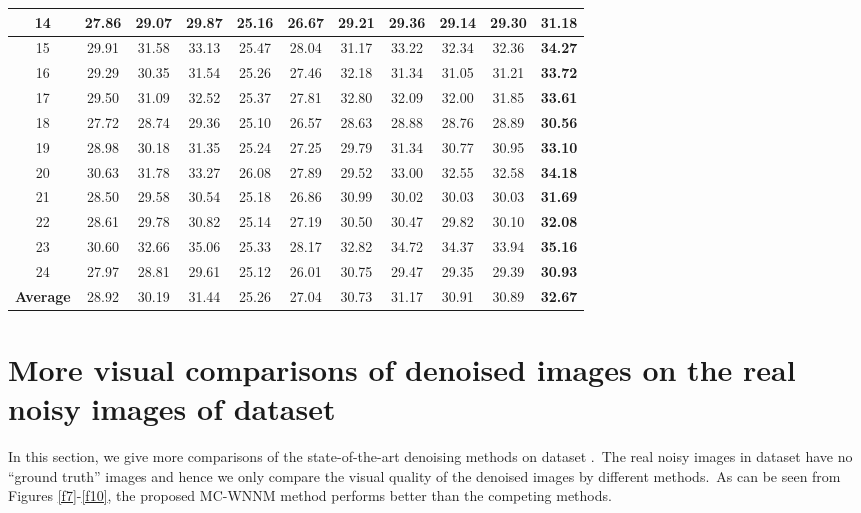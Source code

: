 \documentclass[10pt,onecolumn,letterpaper]{article}
\begin{document}
\begin{table}[!htbp]
\begin{center}
\begin{tabular}{|c||c|c|c|c|c|c|c|c|c|c|}
\\
\hline
14& 27.86 & 29.07 & 29.87 & 25.16 & 26.67 & 29.21 & 29.36 & 29.14 & 29.30 & \textbf{31.18}
\\
\hline
15& 29.91 & 31.58 & 33.13 & 25.47 & 28.04 & 31.17 & 33.22 & 32.34 & 32.36 & \textbf{34.27}
\\
\hline
16& 29.29 & 30.35 & 31.54 & 25.26 & 27.46 & 32.18 & 31.34 & 31.05 & 31.21 & \textbf{33.72}
\\
\hline
17& 29.50 & 31.09 & 32.52 & 25.37 & 27.81 & 32.80 & 32.09 & 32.00 & 31.85 & \textbf{33.61}
\\
\hline
18& 27.72 & 28.74 & 29.36 & 25.10 & 26.57 & 28.63 & 28.88 & 28.76 & 28.89 & \textbf{30.56}
\\
\hline
19& 28.98 & 30.18 & 31.35 & 25.24 & 27.25 & 29.79 & 31.34 & 30.77 & 30.95 & \textbf{33.10}
\\
\hline
20& 30.63 & 31.78 & 33.27 & 26.08 & 27.89 & 29.52 & 33.00 & 32.55 & 32.58 & \textbf{34.18}
\\
\hline
21& 28.50 & 29.58 & 30.54 & 25.18 & 26.86 & 30.99 & 30.02 & 30.03 & 30.03 & \textbf{31.69}
\\
\hline
22& 28.61 & 29.78 & 30.82 & 25.14 & 27.19 & 30.50 & 30.47 & 29.82 & 30.10 & \textbf{32.08}
\\
\hline
23& 30.60 & 32.66 & 35.06 & 25.33 & 28.17 & 32.82 & 34.72 & 34.37 & 33.94 & \textbf{35.16}
\\
\hline
24& 27.97 & 28.81 & 29.61 & 25.12 & 26.01 & 30.75 & 29.47 & 29.35 & 29.39 & \textbf{30.93}
\\
\hline
\textbf{Average}
& 28.92 & 30.19 & 31.44 & 25.26 & 27.04 & 30.73 & 31.17 & 30.91 & 30.89 & \textbf{32.67}
\\
\hline
\end{tabular}
\end{center}
\end{table}

\section{More visual comparisons of denoised images on the real noisy images of dataset \cite{ncwebsite}}

In this section, we give more comparisons of the state-of-the-art denoising methods on dataset \cite{ncwebsite}.\ The real noisy images in dataset \cite{ncwebsite} have no ``ground truth'' images and hence we only compare the visual quality of the denoised images by different methods.\ As can be seen from Figures \ref{f7}-\ref{f10}, the proposed MC-WNNM method performs better than the competing methods.
\end{document}
